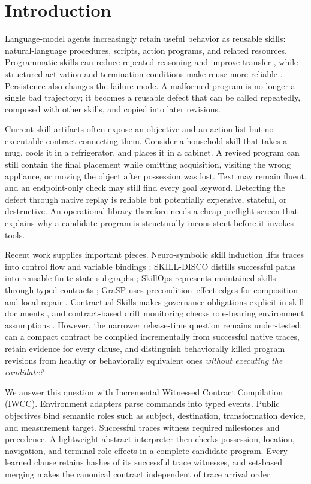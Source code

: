 \documentclass[pdflatex,sn-basic]{sn-jnl}
\begin{document}
\section{Introduction}
Language-model agents increasingly retain useful behavior as reusable skills: natural-language procedures, scripts, action programs, and related resources. Programmatic skills can reduce repeated reasoning and improve transfer \citep{wang2025asi,guo2026skilldisco}, while structured activation and termination conditions make reuse more reliable \citep{mi2026skillpro}. Persistence also changes the failure mode. A malformed program is no longer a single bad trajectory; it becomes a reusable defect that can be called repeatedly, composed with other skills, and copied into later revisions.

Current skill artifacts often expose an objective and an action list but no executable contract connecting them. Consider a household skill that takes a mug, cools it in a refrigerator, and places it in a cabinet. A revised program can still contain the final placement while omitting acquisition, visiting the wrong appliance, or moving the object after possession was lost. Text may remain fluent, and an endpoint-only check may still find every goal keyword. Detecting the defect through native replay is reliable but potentially expensive, stateful, or destructive. An operational library therefore needs a cheap preflight screen that explains why a candidate program is structurally inconsistent before it invokes tools.

Recent work supplies important pieces. Neuro-symbolic skill induction lifts traces into control flow and variable bindings \citep{shao2026nsi}; SKILL-DISCO distills successful paths into reusable finite-state subgraphs \citep{guo2026skilldisco}; SkillOps represents maintained skills through typed contracts \citep{pu2026skillops}; GraSP uses precondition--effect edges for composition and local repair \citep{xia2026grasp}. Contractual Skills makes governance obligations explicit in skill documents \citep{liu2026contractual}, and contract-based drift monitoring checks role-bearing environment assumptions \citep{fan2026drift}. However, the narrower release-time question remains under-tested: can a compact contract be compiled incrementally from successful native traces, retain evidence for every clause, and distinguish behaviorally killed program revisions from healthy or behaviorally equivalent ones \emph{without executing the candidate?}

We answer this question with Incremental Witnessed Contract Compilation (IWCC). Environment adapters parse commands into typed events. Public objectives bind semantic roles such as subject, destination, transformation device, and measurement target. Successful traces witness required milestones and precedence. A lightweight abstract interpreter then checks possession, location, navigation, and terminal role effects in a complete candidate program. Every learned clause retains hashes of its successful trace witnesses, and set-based merging makes the canonical contract independent of trace arrival order.
\end{document}
